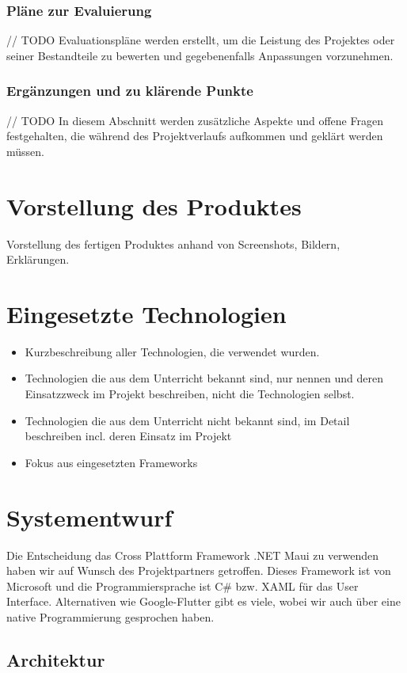 \subsection{Pläne zur Evaluierung}
// TODO
Evaluationspläne werden erstellt, um die Leistung des Projektes oder seiner Bestandteile zu bewerten und gegebenenfalls Anpassungen vorzunehmen.

\subsection{Ergänzungen und zu klärende Punkte}
// TODO
In diesem Abschnitt werden zusätzliche Aspekte und offene Fragen festgehalten, die während des Projektverlaufs aufkommen und geklärt werden müssen.

\chapter{Vorstellung des Produktes}
Vorstellung des fertigen Produktes anhand von Screenshots, Bildern, Erklärungen.

\chapter{Eingesetzte Technologien}
\begin{itemize}
	\item Kurzbeschreibung aller Technologien, die verwendet wurden.
	\item Technologien die aus dem Unterricht bekannt sind, nur nennen und deren  Einsatzzweck im Projekt beschreiben, nicht die Technologien selbst.
	\item Technologien die aus dem Unterricht nicht bekannt sind, im Detail beschreiben incl. deren Einsatz im Projekt
	\item Fokus aus eingesetzten Frameworks
\end{itemize}

\chapter{Systementwurf}
Die Entscheidung das Cross Plattform Framework .NET Maui zu verwenden haben wir auf Wunsch des Projektpartners getroffen. Dieses Framework ist von Microsoft und die Programmiersprache ist C\# bzw. XAML für das User Interface. Alternativen wie Google-Flutter gibt es viele, wobei wir auch über eine native Programmierung gesprochen haben.

\section{Architektur}

